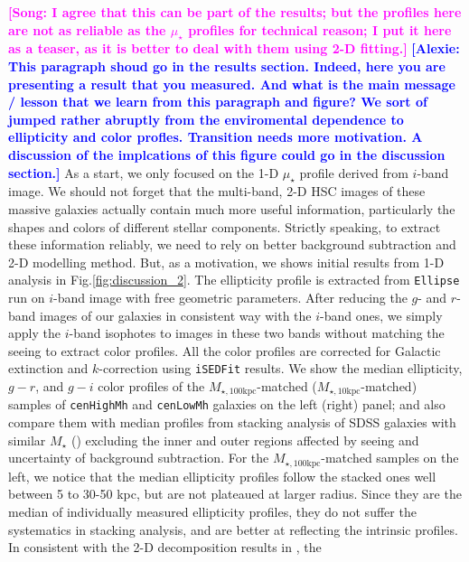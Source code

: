 \documentclass{emulateapj}
\def\rbcg{\texttt{cenHighMh}}
\def\nbcg{\texttt{cenLowMh}}
\def\mstar{{$M_{\star}$}}
\def\minn{{$M_{\star,10\mathrm{kpc}}$}}
\def\mtot{{$M_{\star,100\mathrm{kpc}}$}}
\def\mden{{$\mu_{\star}$}}
\newcommand{\song}[1]{\textcolor{magenta}{\textbf{[Song: #1]}}}
\newcommand{\alexie}[1]{\textcolor{blue}{\textbf{[Alexie: #1]}}}
\begin{document}
\begin{CJK*}{UTF8}{gbsn}
	\song{I agree that this can be part of the results; but the profiles here are not as 
    reliable as the \mden{} profiles for technical reason; I put it here as a teaser, as 
    it is better to deal with them using 2-D fitting.}
\alexie{This paragraph shoud go in the results section. Indeed, here you are presenting a result that you measured. And what is the main message / lesson that we learn from this paragraph and figure? We sort of jumped rather abruptly from the enviromental dependence to ellipticity and color profles. Transition needs more motivation. A discussion of the implcations of this figure could go in the discussion section.}    As a start, we only focused on the 1-D \mden{} profile derived from $i$-band image.  
    We should not forget that the multi-band, 2-D HSC images of these massive galaxies 
    actually contain much more useful information, particularly the shapes and colors 
    of different stellar components.  
    Strictly speaking, to extract these information reliably, we need to rely on better 
    background subtraction and 2-D modelling method.  
    But, as a motivation, we shows initial results from 1-D analysis in 
    Fig.\ref{fig:discussion_2}.  
    The ellipticity profile is extracted from \texttt{Ellipse} run on $i$-band image 
    with free geometric parameters. 
    After reducing the $g$- and $r$-band images of our galaxies in consistent way with 
    the $i$-band ones, we simply apply the $i$-band isophotes to images in these two 
    bands without matching the seeing to extract color profiles. 
    All the color profiles are corrected for Galactic extinction and $k$-correction 
    using \texttt{iSEDFit} results. 
    We show the median ellipticity, $g-r$, and $g-i$ color profiles of the 
    \mtot{}-matched (\minn{}-matched) samples of \rbcg{} and \nbcg{} galaxies on the 
    left (right) panel; and also compare them with median profiles from stacking 
    analysis of SDSS galaxies with similar \mstar{} 
    (\citealt{LaBarbera2010, Tal2011, DSouza2014}) excluding the inner and outer regions 
    affected by seeing and uncertainty of background subtraction.  
    For the \mtot{}-matched samples on the left, we notice that the median ellipticity 
    profiles follow the stacked ones well between 5 to 30-50 kpc, but are not plateaued
    at larger radius.  
    Since they are the median of individually measured ellipticity profiles, they do 
    not suffer the systematics in stacking analysis, and are better at reflecting the 
    intrinsic profiles.  
    In consistent with the 2-D decomposition results in \citep{Huang2013a}, the 

\end{CJK*}
\end{document}
